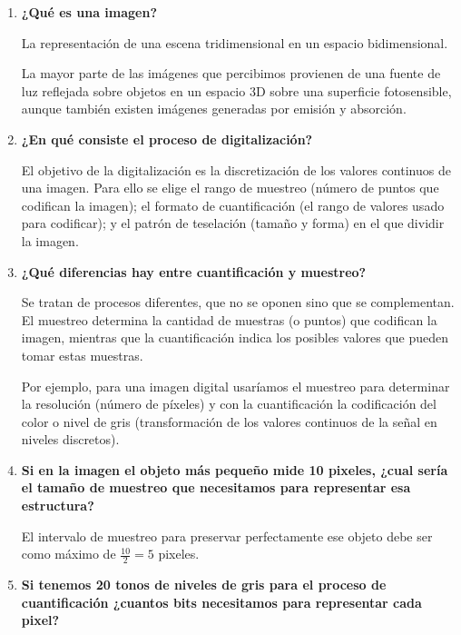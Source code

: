 \documentclass[13pt,a4paper]{article}
\begin{document}
    
    

    \newpage



\begin{enumerate}  
  \item \textbf{¿Qué es una imagen?}
  
  La representación de una escena tridimensional en un espacio bidimensional.

  La mayor parte de las imágenes que percibimos provienen de una fuente de luz reflejada sobre objetos en un espacio 3D sobre una superficie fotosensible, aunque también existen imágenes generadas por emisión y absorción.
  \item \textbf{¿En qué consiste el proceso de digitalización?}

  El objetivo de la digitalización es la discretización de los valores continuos de una imagen. Para ello se elige el rango de muestreo (número de puntos que codifican la imagen); el formato de cuantificación (el rango de valores usado para codificar); y el patrón de teselación (tamaño y forma) en el que dividir la imagen.
  \item \textbf{¿Qué diferencias hay entre cuantificación y muestreo?}

  Se tratan de procesos diferentes, que no se oponen sino que se complementan. El muestreo determina la cantidad de muestras (o puntos) que codifican la imagen, mientras que la cuantificación indica los posibles valores que pueden tomar estas muestras.

  Por ejemplo, para una imagen digital usaríamos el muestreo para determinar la resolución (número de píxeles) y con la cuantificación la codificación del color o nivel de gris (transformación de los valores continuos de la señal en niveles discretos).
  \item \textbf{Si en la imagen el objeto más pequeño mide 10 pixeles, ¿cual sería el tamaño de muestreo que necesitamos para representar esa estructura?}

  El intervalo de muestreo para preservar perfectamente ese objeto debe ser como máximo de $\frac{10}{2} = 5$ pixeles.
  \item \textbf{Si tenemos 20 tonos de niveles de gris para el proceso de cuantificación ¿cuantos bits necesitamos para representar cada pixel?}


\end{enumerate}
\end{document}
